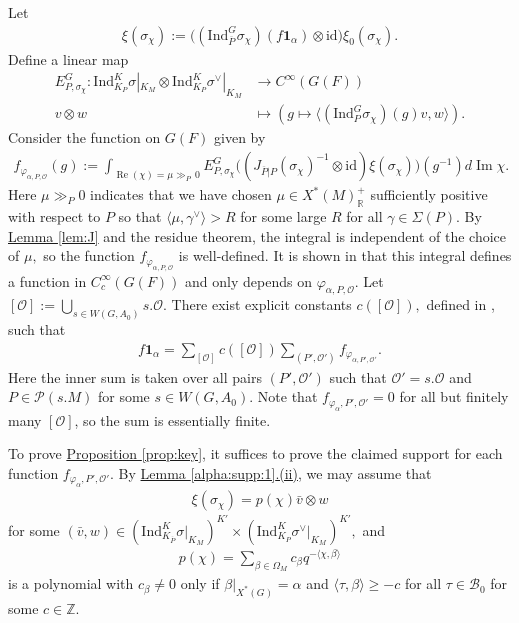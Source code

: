 \documentclass[10pt]{amsart}
\theoremstyle{definition}
\numberwithin{equation}{section}
\numberwithin{equation}{subsection}
\newcommand{\ZZ}{\mathbb{Z}}
\newcommand{\RR}{\mathbb{R}}
\newcommand{\calO}{\mathcal{O}}
\newcommand{\calB}{\mathcal{B}}
\renewcommand{\Im}{\mathop{\mathrm{Im}}}
\renewcommand{\Re}{\mathop{\mathrm{Re}}}
\begin{document}
Let 
\begin{align*}
\xi(\sigma_\chi):=\bigg((\mathrm{Ind}_{\overline{P}}^G \sigma_\chi)(f\mathbf{1}_\alpha)\otimes \mathrm{id}\bigg)\xi_0(\sigma_\chi).
\end{align*}
Define a linear map
\begin{align*}
E   ^{G}_{P,\sigma_\chi}:\mathrm{Ind}_{K_P}^K \sigma|_{K_M}\otimes \mathrm{Ind}_{K_{P}}^K \sigma^\lor |_{K_M}&\longrightarrow C^\infty(G(F))\\
    v\otimes w&\longmapsto \left(g\mapsto \langle (\mathrm{Ind}_P^G\sigma_\chi)(g)v,w\rangle\right).
\end{align*}
Consider the function on $G(F)$ given by
\begin{align}\label{eq:falphaPO}
    f_{\varphi_{\alpha,P,\calO}}(g):=\int_{\Re(\chi)=\mu\gg_P \,0} E^{G}_{P,\sigma_\chi}\big((J_{\overline{P}|P}(\sigma_\chi)^{-1}\otimes \mathrm{id})\xi(\sigma_\chi)\big)(g^{-1}) d\Im\chi.
\end{align}
Here $\mu\gg_P 0$ indicates that we have chosen $\mu\in X^\ast(M)_\RR^+$ sufficiently positive with respect to $P$ so that $\langle \mu, \gamma^\lor\rangle>R$ for some large $R$ for all $\gamma\in \Sigma(P).$ By \hyperref[lem:J]{Lemma \ref{lem:J}} and the residue theorem, the integral is independent of the choice of $\mu,$ so the function $f_{\varphi_{\alpha,P,\calO}}$ is well-defined. It is shown in \cite{Heiermann:HeckePlan} that this integral defines a function in $C^\infty_c(G(F))$ and only depends on $\varphi_{\alpha,P,\mathcal{O}}$. Let $[\mathcal{O}]:=\bigcup_{s\in W(G,A_0)}s.\mathcal{O}.$ There exist explicit constants $c([\mathcal{O}]),$ defined in \cite[\S 3.2]{Heiermann:HeckePlan}, such that
\begin{align*}
    f\mathbf{1}_\alpha=\sum_{[\mathcal{O}]}c([\mathcal{O}])\sum_{(P',\mathcal{O'})}f_{\varphi_{\alpha,P',\calO'}}.
\end{align*}
Here the inner sum is taken over all pairs $(P',\calO')$ such that $ \mathcal{O'}=s.\mathcal{O}$ and $P\in \mathcal{P}(s.M)$ for some $s\in W(G,A_0).$ Note that $f_{\varphi_\alpha,P',\mathcal{O'}} = 0$ for all but finitely many $[\mathcal{O}]$, so the sum is essentially finite. 

To prove \hyperref[prop:key]{Proposition \ref{prop:key}}, it suffices to prove the claimed support for each function $f_{\varphi_\alpha,P',\mathcal{O}'}$. By \hyperref[alpha:supp:1]{Lemma \ref{alpha:supp:1}.(ii)}, we may assume that
\begin{align*}
    \xi(\sigma_\chi)=p(\chi)\bar{v}\otimes w
\end{align*}
for some $(\bar{v},w)\in (\mathrm{Ind}_{K_{\overline{P}}}^K\sigma|_{K_M})^{K'}\times (\mathrm{Ind}_{K_P}^K\sigma^\lor |_{K_M})^{K'},$ and
\begin{align}\label{eq:p:expansion}
    p(\chi)=\sum_{\beta\in \Omega_M} c_\beta q^{-\langle \chi,\beta\rangle}
\end{align}
is a polynomial with $c_\beta\neq 0$ only if $\beta\vert_{X^*(G)} = \alpha$ and $  \langle \tau,\beta\rangle\geq -c$ for all $\tau\in \calB_0$ for some $c\in \ZZ$. 
\end{document}
